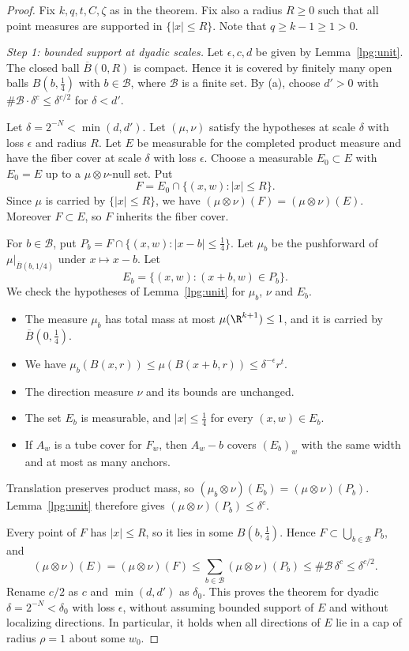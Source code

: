 \begin{proof}
Fix $k,q,t,C,\zeta$ as in the theorem. Fix also a radius $R\ge0$ such that all point measures are supported in $\{|x|\le R\}$. Note that $q\ge k-1\ge1>0$.

\emph{Step 1: bounded support at dyadic scales.} Let $\epsilon,c,d$ be given by Lemma~\ref{lpg:unit}. The closed ball $\overline B(0,R)$ is compact. Hence it is covered by finitely many open balls $B(b,\tfrac14)$ with $b\in\mathcal B$, where $\mathcal B$ is a finite set. By (a), choose $d'>0$ with $\#\mathcal B\cdot\delta^c\le\delta^{c/2}$ for $\delta<d'$.

Let $\delta=2^{-N}<\min(d,d')$. Let $(\mu,\nu)$ satisfy the hypotheses at scale $\delta$ with loss $\epsilon$ and radius $R$. Let $E$ be measurable for the completed product measure and have the fiber cover at scale $\delta$ with loss $\epsilon$. Choose a measurable $E_0\subset E$ with $E_0=E$ up to a $\mu\otimes\nu$-null set. Put
\[
F=E_0\cap\{(x,w):|x|\le R\}.
\]
Since $\mu$ is carried by $\{|x|\le R\}$, we have $(\mu\otimes\nu)(F)=(\mu\otimes\nu)(E)$. Moreover $F\subset E$, so $F$ inherits the fiber cover.

For $b\in\mathcal B$, put $P_b=F\cap\{(x,w):|x-b|\le\tfrac14\}$. Let $\mu_b$ be the pushforward of $\mu|_{\overline B(b,1/4)}$ under $x\mapsto x-b$. Let
\[
E_b=\{(x,w):(x+b,w)\in P_b\}.
\]
We check the hypotheses of Lemma~\ref{lpg:unit} for $\mu_b$, $\nu$ and $E_b$.
\begin{itemize}
\item The measure $\mu_b$ has total mass at most $\mu(\R^{k+1})\le1$, and it is carried by $\overline B(0,\tfrac14)$.
\item We have $\mu_b(B(x,r))\le\mu(B(x+b,r))\le\delta^{-\epsilon}r^t$.
\item The direction measure $\nu$ and its bounds are unchanged.
\item The set $E_b$ is measurable, and $|x|\le\tfrac14$ for every $(x,w)\in E_b$.
\item If $A_w$ is a tube cover for $F_w$, then $A_w-b$ covers $(E_b)_w$ with the same width and at most as many anchors.
\end{itemize}
Translation preserves product mass, so $(\mu_b\otimes\nu)(E_b)=(\mu\otimes\nu)(P_b)$. Lemma~\ref{lpg:unit} therefore gives $(\mu\otimes\nu)(P_b)\le\delta^c$.

Every point of $F$ has $|x|\le R$, so it lies in some $B(b,\tfrac14)$. Hence $F\subset\bigcup_{b\in\mathcal B}P_b$, and
\[
(\mu\otimes\nu)(E)=(\mu\otimes\nu)(F)\le\sum_{b\in\mathcal B}(\mu\otimes\nu)(P_b)\le\#\mathcal B\,\delta^c\le\delta^{c/2}.
\]
Rename $c/2$ as $c$ and $\min(d,d')$ as $\delta_0$. This proves the theorem for dyadic $\delta=2^{-N}<\delta_0$ with loss $\epsilon$, without assuming bounded support of $E$ and without localizing directions. In particular, it holds when all directions of $E$ lie in a cap of radius $\rho=1$ about some $w_0$.


\end{proof}
